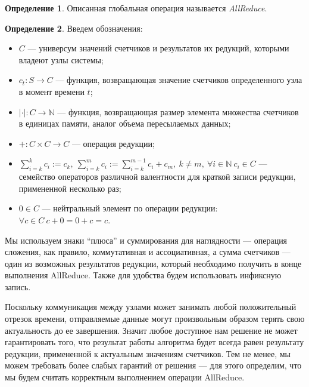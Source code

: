 \documentclass{article}
\theoremstyle{plain}
\theoremstyle{plain}
\theoremstyle{plain}
\theoremstyle{plain}
\theoremstyle{definition}
\newtheorem{definition}{Определение}[section]
\theoremstyle{remark}
\theoremstyle{plain}
\begin{document}
\begin{definition}
    Описанная глобальная операция называется \textit{AllReduce}.
\end{definition}

\begin{definition}
    Введем обозначения:
    \begin{itemize}
        \item $C$ --- универсум значений счетчиков и результатов их редукций, которыми владеют узлы системы;
        \item $c_t : S \to C$ --- функция, возвращающая значение счетчиков определенного узла в момент времени $t$;
        \item $|\cdot| : C \to \mathbb{N}$ --- функция, возвращающая размер элемента множества счетчиков в единицах памяти, аналог объема пересылаемых данных;
        \item $+ : C \times C \to C$ --- операция редукции;
        \item $\displaystyle \sum_{i = k}^k c_i := c_k,\ \displaystyle \sum_{i = k}^m c_i := \displaystyle \sum_{i = k}^{m - 1} c_i + c_m,\ k \neq m,\ \forall i \in \mathbb{N}\ c_i \in C$ --- семейство операторов различной валентности для краткой записи редукции, примененной несколько раз;
        \item $0 \in C$ --- нейтральный элемент по операции редукции: $\forall c \in C\ c + 0 = 0 + c = c$.
    \end{itemize}
\end{definition}

Мы используем знаки \enquote{плюса} и суммирования для наглядности --- операция сложения, как правило, коммутативная и ассоциативная, а сумма счетчиков --- один из возможных результатов редукции, который необходимо получить в конце выполнения AllReduce. Также для удобства будем использовать инфиксную запись.

Поскольку коммуникация между узлами может занимать любой положительный отрезок времени, отправляемые данные могут произвольным образом терять свою актуальность до ее завершения. Значит любое доступное нам решение не может гарантировать того, что результат работы алгоритма будет всегда равен результату редукции, примененной к актуальным значениям счетчиков. Тем не менее, мы можем требовать более слабых гарантий от решения --- для этого определим, что мы будем считать корректным выполнением операции AllReduce.
\end{document}
